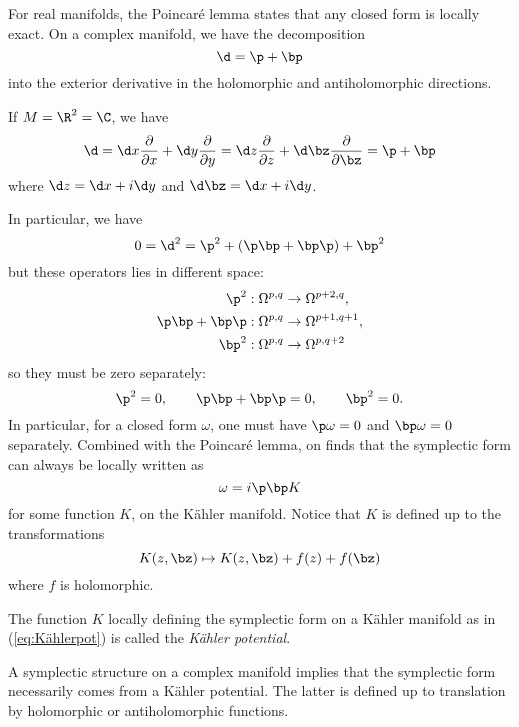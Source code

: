 \documentclass{worksheetclass}
\begin{document}
        For real manifolds, the Poincaré lemma states that any closed form is locally exact. On a complex manifold, we have the decomposition
        \begin{equation}
            \d= \p + \bp
        \end{equation}
        into the exterior derivative in the holomorphic and antiholomorphic directions.
        \begin{examp}
            If $M=\R^2=\C$, we have
            \begin{equation}
                \d=\d x \pdv{}{x}+\d y \pdv{}{y} = \d z\pdv{}{z}+\d\bz\pdv{}{\bz}=\p+\bp
            \end{equation}
            where $\d z=\d x+i\d y$ and $\d\bz =\d x+i\d y$.
        \end{examp}
        In particular, we have
        \begin{equation}
            0 = \d^2 = \p^2 + (\p\bp+\bp\p) + \bp^2
        \end{equation}
        but these operators lies in different space:
        \begin{align}
            \p^2&:\Omega^{p,q}\to\Omega^{p+2,q},\\
            \p\bp+\bp\p&:\Omega^{p,q}\to\Omega^{p+1,q+1},\\
            \bp^2&:\Omega^{p,q}\to\Omega^{p,q+2}
        \end{align}
        so they must be zero separately:
        \begin{equation}
            \p^2=0,\qquad \p\bp+\bp\p=0,\qquad \bp^2=0.
        \end{equation}
        In particular, for a closed form $\omega$, one must have $\p\omega=0$ and $\bp\omega=0$ separately. Combined with the Poincaré lemma, on finds that the symplectic form can always be locally written as
        \begin{equation}\label{eq:Kählerpot}
            \omega = i\p\bp K 
        \end{equation}
        for some function $K$, on the Kähler manifold. Notice that $K$ is defined up to the transformations
        \begin{equation}
            K(z,\bz)\mapsto K(z,\bz)+f(z)+f(\bz)
        \end{equation}
        where $f$ is holomorphic.
        \begin{defn}
            The function $K$ locally defining the symplectic form on a Kähler manifold as in (\ref{eq:Kählerpot}) is called the \emph{Kähler potential}.
        \end{defn}
        \begin{result}
            A symplectic structure on a complex manifold implies that the symplectic form necessarily comes from a Kähler potential. The latter is defined up to translation by holomorphic or antiholomorphic functions.
        \end{result}
        
\end{document}
